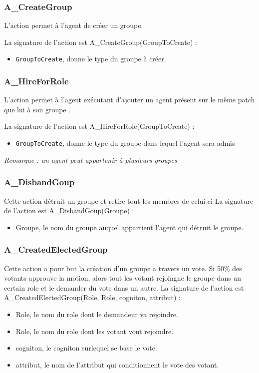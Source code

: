 	
	\subsubsection{A\_CreateGroup}
	
	L'action permet à l'agent  de créer un groupe. 
	
	La signature de l'action  est A\_CreateGroup(GroupToCreate) : 
	
	\begin{itemize}
	\item \texttt{GroupToCreate}, donne le type du groupe à créer.
	\end{itemize}
	
	\subsubsection{A\_HireForRole}
	
	L'action permet à l'agent exécutant d'ajouter un agent présent sur le même patch que lui à son groupe . 
	
	La signature de l'action est A\_HireForRole(GroupToCreate) :
	
	\begin{itemize}
	\item \texttt{GroupToCreate}, donne  le type du groupe dans lequel  l'agent sera admis
	\end{itemize}
	
	\textit{Remarque : un agent peut appartenir à plusieurs groupes}
	
	
	\subsubsection{A\_DisbandGoup}

Cette action détruit un groupe et retire tout les membres de celui-ci
La signature de l'action est A\_DisbandGoup(Groupe) :
\begin{itemize}
\item Groupe, le nom du groupe auquel appartient l'agent qui détruit le groupe.
\end{itemize}

\subsubsection{A\_CreatedElectedGroup}

Cette action a pour but la création d'un groupe a travers un vote. Si 50\% des votants approuve la motion, alors tout les votant rejoingne le groupe dans un certain role et le demander du vote dans un autre. 
La signature de l'action est A\_CreatedElectedGroup(Role, Role, cogniton, attribut) :
\begin{itemize}
\item Role, le nom du role dont le demandeur va rejoindre.
\item Role, le nom du role dont les votant vont rejoindre.
\item cogniton, le cogniton surlequel se base le vote.
\item attribut, le nom de l'attribut qui conditionnent le vote des votant.\end{itemize}



